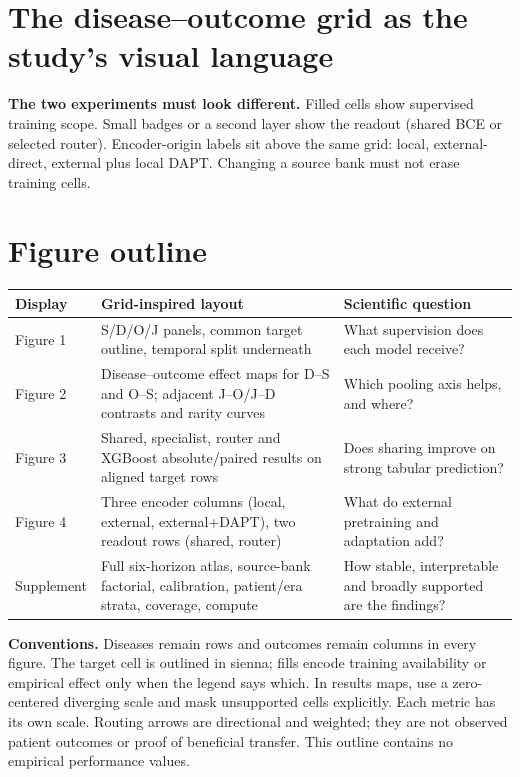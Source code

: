 \documentclass[10pt]{article}
\begin{document}
\section*{The disease--outcome grid as the study's visual language}
\resizebox{\textwidth}{!}{}

\vspace{5mm}
\noindent\textbf{The two experiments must look different.}
Filled cells show supervised training scope. Small badges or a second layer
show the readout (shared BCE or selected router). Encoder-origin labels sit
above the same grid: local, external-direct, external plus local DAPT.
Changing a source bank must not erase training cells.

\section*{Figure outline}
\begin{tabularx}{\textwidth}{@{}lXX@{}}
\toprule
Display & Grid-inspired layout & Scientific question \\
\midrule
Figure 1 & S/D/O/J panels, common target outline, temporal split underneath & What supervision does each model receive? \\
Figure 2 & Disease--outcome effect maps for D--S and O--S; adjacent J--O/J--D contrasts and rarity curves & Which pooling axis helps, and where? \\
Figure 3 & Shared, specialist, router and XGBoost absolute/paired results on aligned target rows & Does sharing improve on strong tabular prediction? \\
Figure 4 & Three encoder columns (local, external, external+DAPT), two readout rows (shared, router) & What do external pretraining and adaptation add? \\
Supplement & Full six-horizon atlas, source-bank factorial, calibration, patient/era strata, coverage, compute & How stable, interpretable and broadly supported are the findings? \\
\bottomrule
\end{tabularx}

\vspace{5mm}
\noindent\textbf{Conventions.} Diseases remain rows and outcomes remain columns
in every figure. The target cell is outlined in sienna; fills encode training
availability or empirical effect only when the legend says which. In results
maps, use a zero-centered diverging scale and mask unsupported cells explicitly.
Each metric has its own scale. Routing arrows are directional and weighted;
they are not observed patient outcomes or proof of beneficial transfer.
This outline contains no empirical performance values.
\end{document}
